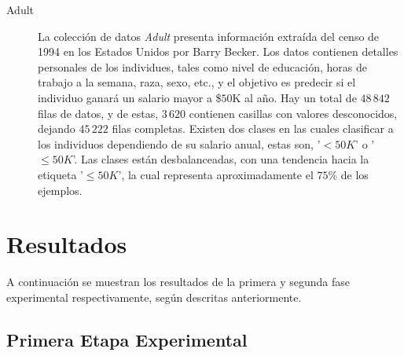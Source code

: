 \begin{description}
\item[Adult]
La colección de datos \emph{Adult} \parencite{ucidata} presenta información extraída del censo de 1994 en los Estados Unidos por Barry Becker.
Los datos contienen detalles personales de los individues, tales como nivel de educación, horas de trabajo a la semana, raza, sexo, etc., y el objetivo es predecir si el individuo ganará un salario mayor a \$$50$K al año.
Hay un total de $48\,842$ filas de datos, y de estas, $3\,620$ contienen casillas con valores desconocidos, dejando $45\,222$ filas completas.
Existen dos clases en las cuales clasificar a los individuos dependiendo de su salario anual, estas son, '$<50K$' o '$\leq50K$'.
Las clases están desbalanceadas, con una tendencia hacia la etiqueta '$\leq50K$', la cual representa aproximadamente el $75\%$ de los ejemplos.

\end{description}

\section{Resultados}

A continuación se muestran los resultados de la primera y segunda fase experimental respectivamente, según descritas anteriormente.

\subsection*{Primera Etapa Experimental}
